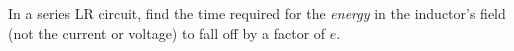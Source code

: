 In a series LR circuit, find the time required for the \emph{energy} in the inductor's
field (not the current or voltage) to fall off by a factor of $e$.\answercheck
